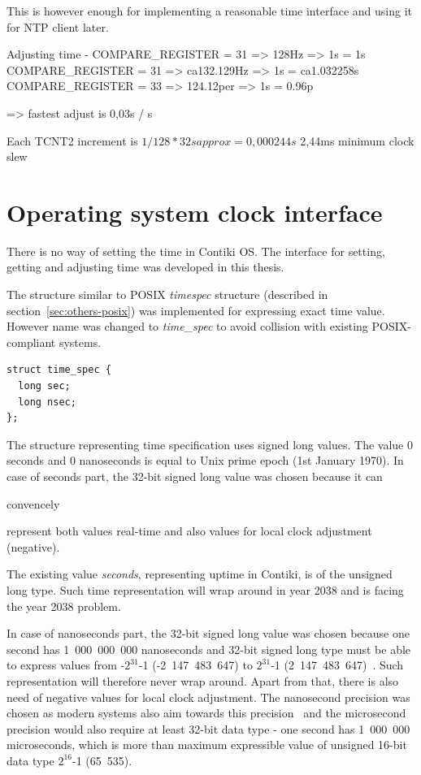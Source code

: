 
This is however enough for implementing a reasonable time interface and using it for NTP client later.



Adjusting time - COMPARE\_REGISTER = 31 => 128Hz => 1s = 1s
COMPARE\_REGISTER = 31 => ca132.129Hz => 1s = ca1.032258s
COMPARE\_REGISTER = 33 => 124.12per => 1s = 0.96p

=> fastest adjust is 0,03s / s


Each TCNT2 increment is $1/128*32 s  approx= 0,000244 s$
2,44ms minimum clock slew


\section{Operating system clock interface}
There is no way of setting the time in Contiki OS.
The interface for setting, getting and adjusting time was developed in this thesis.

The structure similar to POSIX {\it{timespec}} structure (described in section~\ref{sec:others-posix})
was implemented for expressing exact time value.
However name was changed to {\it{time\_spec}} to avoid collision with existing POSIX-compliant systems.
\begin{lstlisting}
struct time_spec {
  long sec;
  long nsec;
};
\end{lstlisting}
The structure representing time specification uses signed long values.
The value 0 seconds and 0 nanoseconds is equal to Unix prime epoch (1st January 1970).
In case of seconds part, the 32-bit signed long value was chosen because
it can

convencely

represent both values real-time and also values for local clock adjustment (negative).

The existing value {\it{seconds}}, representing uptime in Contiki, is of the unsigned long type.
Such time representation will wrap around in year 2038 and is facing the year 2038 problem.

In case of nanoseconds part, the 32-bit signed long value was chosen because
one second has 1~000~000~000 nanoseconds and
32-bit signed long type must be able to express values from -$2^{31}$-1 (-2~147~483~647)
to $2^{31}$-1 (2~147~483~647)~\cite{c99}.
Such representation will therefore never wrap around.
Apart from that, there is also need of negative values for local clock adjustment.
The nanosecond precision was chosen as modern systems also aim towards this
precision~\cite{posix,ntp-precision} and
the microsecond precision would also require at least 32-bit data type -
one second has 1~000~000 microseconds, which is more than maximum expressible value of unsigned 16-bit
data type $2^{16}$-1 (65~535).

